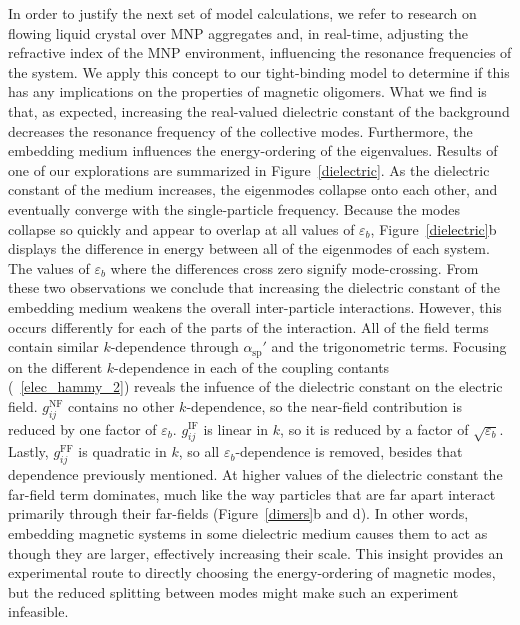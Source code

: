 \documentclass[journal=apchd5,manuscript=article]{achemso}
\begin{document}
In order to justify the next set of model calculations, we refer to research on flowing liquid crystal over MNP aggregates and, in real-time, adjusting the refractive index of the MNP environment, influencing the resonance frequencies of the system\cite{odom_lasing}. We apply this concept to our tight-binding model to determine if this has any implications on the properties of magnetic oligomers. What we find is that, as expected, increasing the real-valued dielectric constant of the background decreases the resonance frequency of the collective modes. Furthermore, the embedding medium influences the energy-ordering of the eigenvalues. Results of one of our explorations are summarized in Figure~\ref{dielectric}. As the dielectric constant of the medium increases, the eigenmodes collapse onto each other, and eventually converge with the single-particle frequency. Because the modes collapse so quickly and appear to overlap at all values of $\varepsilon_b$, Figure~\ref{dielectric}b displays the difference in energy between all of the eigenmodes of each system. The values of $\varepsilon_b$ where the differences cross zero signify mode-crossing. 
From these two observations we conclude that increasing the dielectric constant of the embedding medium weakens the overall inter-particle interactions. However, this occurs differently for each of the parts of the interaction. All of the field terms contain similar $k$-dependence through $\alpha_{\textrm{sp}}'$ and the trigonometric terms. Focusing on the different $k$-dependence in each of the coupling contants (~\ref{elec_hammy_2}) reveals the infuence of the dielectric constant on the electric field. $g_{ij}^\textrm{NF}$ contains no other $k$-dependence, so the near-field contribution is reduced by one factor of $\varepsilon_b$.  $g_{ij}^\textrm{IF}$ is linear in $k$, so it is reduced by a factor of $\sqrt{\varepsilon_b}$. Lastly,  $g_{ij}^\textrm{FF}$ is quadratic in $k$, so all $\varepsilon_b$-dependence is removed, besides that dependence previously mentioned. At higher values of the dielectric constant the far-field term dominates, much like the way particles that are far apart interact primarily through their far-fields (Figure~\ref{dimers}b and d). In other words, embedding magnetic systems in some dielectric medium causes them to act as though they are larger, effectively increasing their scale. This insight provides an experimental route to directly choosing the energy-ordering of magnetic modes, but the reduced splitting between modes might make such an experiment infeasible.
\end{document}
